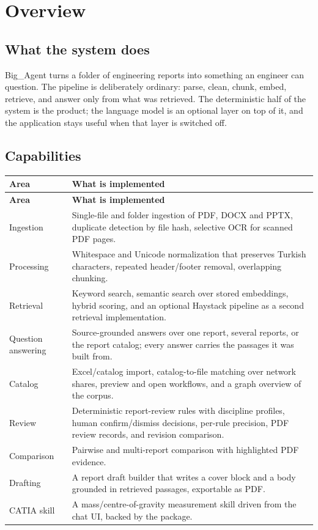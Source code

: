 \chapter{Overview}
\label{ch:overview}

\section{What the system does}

Big\_Agent turns a folder of engineering reports into something an engineer can
question. The pipeline is deliberately ordinary: parse, clean, chunk, embed,
retrieve, and answer only from what was retrieved. The deterministic half of
the system is the product; the language model is an optional layer on top of
it, and the application stays useful when that layer is switched off.

\section{Capabilities}

\begin{longtable}{L{0.26\textwidth} L{0.66\textwidth}}
\toprule
\textbf{Area} & \textbf{What is implemented} \\
\midrule
\endfirsthead
\toprule
\textbf{Area} & \textbf{What is implemented} \\
\midrule
\endhead
\bottomrule
\endfoot
Ingestion & Single-file and folder ingestion of PDF, DOCX and PPTX, duplicate
detection by file hash, selective OCR for scanned PDF pages. \\
Processing & Whitespace and Unicode normalization that preserves Turkish
characters, repeated header/footer removal, overlapping chunking. \\
Retrieval & Keyword search, semantic search over stored embeddings, hybrid
scoring, and an optional Haystack pipeline as a second retrieval
implementation. \\
Question answering & Source-grounded answers over one report, several reports,
or the report catalog; every answer carries the passages it was built from. \\
Catalog & Excel/catalog import, catalog-to-file matching over network shares,
preview and open workflows, and a graph overview of the corpus. \\
Review & Deterministic report-review rules with discipline profiles, human
confirm/dismiss decisions, per-rule precision, PDF review records, and revision
comparison. \\
Comparison & Pairwise and multi-report comparison with highlighted PDF
evidence. \\
Drafting & A report draft builder that writes a cover block and a body grounded
in retrieved passages, exportable as PDF. \\
CATIA skill & A mass/centre-of-gravity measurement skill driven from the chat
UI, backed by the  package. \\
\end{longtable}

